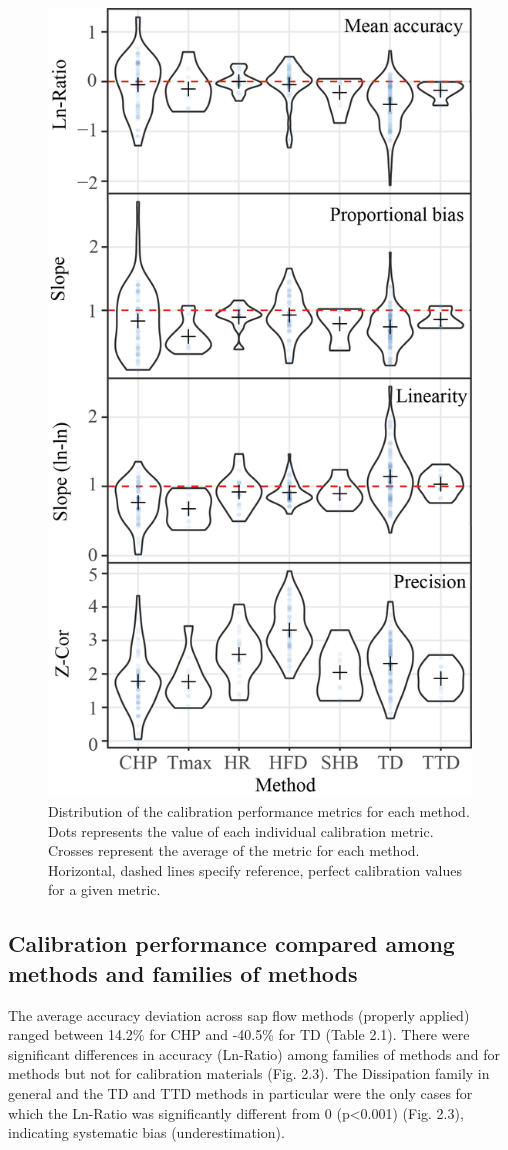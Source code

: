 \documentclass[11pt,twoside]{reedthesis}
\begin{document}
\begin{figure}[hbt!]

{\centering \includegraphics[width=0.55\linewidth]{figure/CH2/Distribution-metrics-orderedV4} 

}

\caption[Distribution of the calibration performance metrics for each method.]{Distribution of the calibration performance metrics for each method. Dots represents the value of each individual calibration metric. Crosses represent the average of the metric for each method. Horizontal, dashed lines specify reference, perfect calibration values for a given metric.}\label{fig:ch2fig2}
\end{figure}
\subsection{Calibration performance compared among methods and families
of
methods}\label{calibration-performance-compared-among-methods-and-families-of-methods}

The average accuracy deviation across sap flow methods (properly
applied) ranged between 14.2\% for CHP and -40.5\% for TD (Table 2.1).
There were significant differences in accuracy (Ln-Ratio) among families
of methods and for methods but not for calibration materials (Fig. 2.3).
The Dissipation family in general and the TD and TTD methods in
particular were the only cases for which the Ln-Ratio was significantly
different from 0 (p\textless{}0.001) (Fig. 2.3), indicating systematic
bias (underestimation).\par
\end{document}
